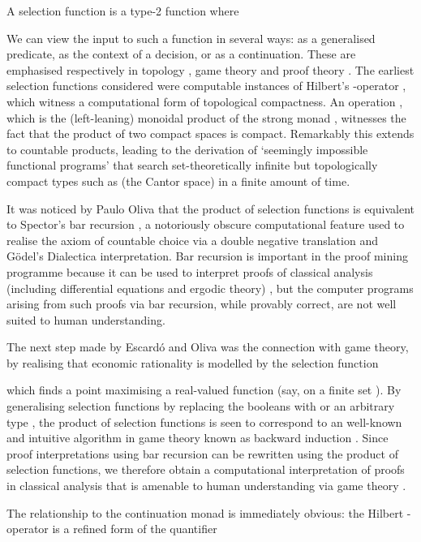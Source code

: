 \documentclass{article}
\begin{document}
A selection function is a type-2 function  where

We can view the input  to such a function in several ways: as a generalised predicate, as the context of a decision, or as a continuation. These are emphasised respectively in topology \citep{escardo08}, game theory \citep{escardo11} and proof theory \citep{escardo12b}. The earliest selection functions considered were computable instances of Hilbert's -operator , which witness a computational form of topological compactness. An operation , which is the (left-leaning) monoidal product of the strong monad , witnesses the fact that the product of two compact spaces is compact. Remarkably this extends to countable products, leading to the derivation of `seemingly impossible functional programs' \citep{escardo07} that search set-theoretically infinite but topologically compact types such as  (the Cantor space) in a finite amount of time.

It was noticed by Paulo Oliva that the product of selection functions is equivalent to Spector's bar recursion \citep{escardo14}, a notoriously obscure computational feature used to realise the axiom of countable choice via a double negative translation and G\"odel's Dialectica interpretation. Bar recursion is important in the proof mining programme because it can be used to interpret proofs of classical analysis (including differential equations and ergodic theory) \citep{kohlenbach08}, but the computer programs arising from such proofs via bar recursion, while provably correct, are not well suited to human understanding.

The next step made by Escard\'o and Oliva was the connection with game theory, by realising that economic rationality is modelled by the selection function

which finds a point maximising a real-valued function (say, on a finite set ). By generalising selection functions by replacing the booleans with  or an arbitrary type , the product of selection functions is seen to correspond to an well-known and intuitive algorithm in game theory known as backward induction \citep{escardo11}. Since proof interpretations using bar recursion can be rewritten using the product of selection functions, we therefore obtain a computational interpretation of proofs in classical analysis that is amenable to human understanding via game theory \citep{oliva12b}.

The relationship to the continuation monad is immediately obvious: the Hilbert -operator is a refined form of the quantifier
\end{document}
